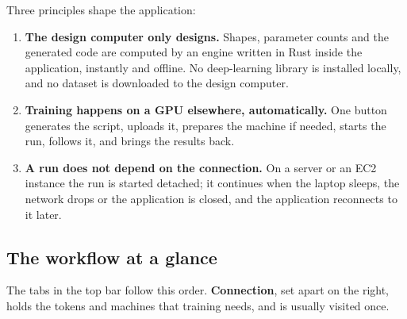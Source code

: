 \documentclass[11pt,a4paper]{article}
\newcommand{\ui}[1]{\textbf{\textsf{#1}}}
\begin{document}
Three principles shape the application:
\begin{enumerate}
  \item \textbf{The design computer only designs.} Shapes, parameter counts and the generated code are computed by an engine written in
        Rust inside the application, instantly and offline. No deep-learning library is installed locally, and no dataset is downloaded
        to the design computer.
  \item \textbf{Training happens on a GPU elsewhere, automatically.} One button generates the script, uploads it, prepares the machine
        if needed, starts the run, follows it, and brings the results back.
  \item \textbf{A run does not depend on the connection.} On a server or an EC2 instance the run is started detached; it continues
        when the laptop sleeps, the network drops or the application is closed, and the application reconnects to it later.
\end{enumerate}

\subsection{The workflow at a glance}
\begin{center}
\end{center}
The tabs in the top bar follow this order. \ui{Connection}, set apart on the right, holds the tokens and machines that training needs,
and is usually visited once.
\end{document}
